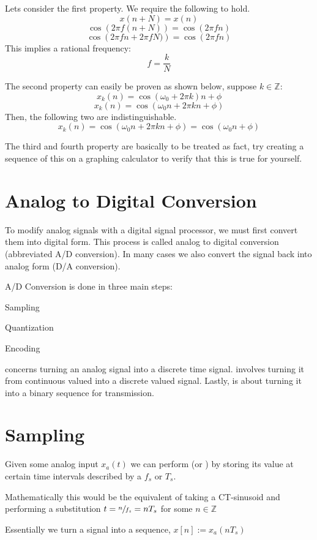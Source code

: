 Lets consider the first property. We require the following to hold. 
\[	x(n+N) = x(n)	\]
\[ \cos{\left(2\pi f (n + N) \right)} = \cos{(2\pi f n)}	\]
\[ \cos{\left(2\pi f n + 2\pi fN) \right)} = \cos{(2\pi f n)}	\]
This implies a rational frequency:
\[ f = \frac{k}{N} \]

The second property can easily be proven as shown below, suppose $k\in\mathbb{Z}$:
\[ x_k (n) = \cos{(\omega_0 + 2\pi k)n + \phi}	\]
\[ x_k (n) = \cos{(\omega_0n + 2\pi k n +\phi)}	\]
Then, the following two are indistinguishable.
\[ x_k (n) = \cos{(\omega_0n + 2\pi k n +\phi)}	= \cos{(\omega_0n + \phi)} \]

The third and fourth property are basically to be treated as fact, try creating a sequence of this on a graphing calculator to verify that this is true for yourself.

\section{Analog to Digital Conversion}
To modify analog signals with a digital signal processor, we must first convert them into digital form. This process is called analog to digital conversion (abbreviated A/D conversion). In many cases we also convert the signal back into analog form (D/A conversion).

A/D Conversion is done in three main steps:
\begin{bullets}
	\item Sampling
	\item Quantization
	\item Encoding
\end{bullets}

 concerns turning an analog signal into a discrete time signal.  involves turning it from continuous valued into a discrete valued signal. Lastly,  is about turning it into a binary sequence for transmission.

\section{Sampling}

Given some analog input $x_a (t)$ we can perform  (or ) by storing its value at certain time intervals described by a  $f_s$ or  $T_s$.
\begin{bullets}
	\item Mathematically this would be the equivalent of taking a CT-sinusoid and performing a substitution $t = \sfrac{n}{f_s} = nT_s$ for some $n\in\mathbb{Z}$
	\item Essentially we turn a signal into a sequence, $x[n] := x_a (nT_s)$
\end{bullets}

